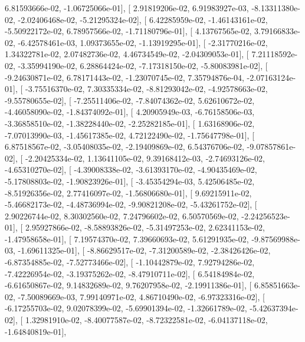 \documentclass{article}
\begin{document}
          6.81593666e-02,  -1.06725066e-01],
       [  2.91819206e-02,   6.91983927e-03,  -8.13311380e-02,
         -2.02406468e-02,  -5.21295324e-02],
       [  6.42285959e-02,  -1.46143161e-02,  -5.50922172e-02,
          6.78957566e-02,  -1.71180796e-01],
       [  4.13767565e-02,   3.79166833e-02,  -6.42578461e-03,
          1.09373655e-02,  -1.13919295e-01],
       [ -2.31770216e-02,   1.34322781e-02,   2.07482736e-02,
          4.46734549e-02,  -2.04309053e-01],
       [  7.21118592e-02,  -3.35994190e-02,   6.28864424e-02,
         -7.17318150e-02,  -5.80083981e-02],
       [ -9.24630871e-02,   6.78171443e-02,  -1.23070745e-02,
          7.35794876e-04,  -2.07163124e-01],
       [ -3.75516370e-02,   7.30335334e-02,  -8.81293042e-02,
         -4.92578663e-02,  -9.55780655e-02],
       [ -7.25511406e-02,  -7.84074362e-02,   5.62610672e-02,
         -4.46058090e-02,  -1.84374092e-01],
       [  4.20905949e-03,  -6.76158506e-03,  -3.36858510e-02,
         -1.38228440e-02,  -2.25282185e-01],
       [  1.63168906e-02,  -7.07013990e-03,  -1.45617385e-02,
          4.72122490e-02,  -1.75647798e-01],
       [  6.87518567e-02,  -3.05408035e-02,  -2.19409869e-02,
          6.54376706e-02,  -9.07857861e-02],
       [ -2.20425334e-02,   1.13641105e-02,   9.39168412e-03,
         -2.74693126e-02,  -4.65310270e-02],
       [ -4.39008338e-02,  -3.61393170e-02,  -4.90435469e-02,
         -5.17808803e-02,  -1.90823926e-01],
       [ -3.45354294e-03,   5.42506485e-02,  -8.51926356e-02,
          2.77416097e-02,  -1.56806680e-01],
       [  9.69215911e-02,  -5.46682173e-02,  -4.48736994e-02,
         -9.90821208e-02,  -5.43261752e-02],
       [  2.90226744e-02,   8.30302560e-02,   7.24796602e-02,
          6.50570569e-02,  -2.24256523e-01],
       [  2.95927866e-02,  -8.58893826e-02,  -5.31497253e-02,
          2.62341153e-02,  -1.47958658e-01],
       [  7.19574370e-02,   7.39660693e-02,   5.61291935e-02,
         -9.87569988e-03,  -1.69611325e-01],
       [ -8.86629517e-02,  -7.31200589e-02,  -2.38426426e-02,
         -6.87354885e-02,  -7.52773466e-02],
       [ -1.10442879e-02,   7.92794286e-02,  -7.42226954e-02,
         -3.19375262e-02,  -8.47910711e-02],
       [  6.54184984e-02,  -6.61650867e-02,   9.14832689e-02,
          9.76207958e-02,  -2.19911386e-01],
       [  6.85851663e-02,  -7.50089669e-03,   7.99140971e-02,
          4.86710490e-02,  -6.97323316e-02],
       [ -6.17255703e-02,   9.02078399e-02,  -5.69901394e-02,
         -1.32661789e-02,  -5.42637394e-02],
       [  1.32981910e-02,  -8.40077587e-02,  -8.72322581e-02,
         -6.04137118e-02,  -1.64840819e-01],
\end{document}
